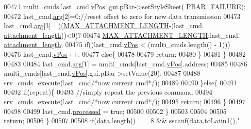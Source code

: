 \begin{DoxyCode}
{{{{{{{{{{{{{{{{00471                      multi\_cmds[last\_cmd.\hyperlink{a00004_a2b48b371fd84be2a8ad581b1ad708b88}{vPos}].gui.pBar->setStyleSheet(
      \hyperlink{a00090_aa9f43b2774395af6510910f8feed7cb4}{PBAR\_FAILURE});
00472                      last\_cmd.\hyperlink{a00004_a56e6c2d7315d0ae60a51e8b140c9cfe4}{arg}[2]=0;\textcolor{comment}{//reset offset to zero for new data transmission}
00473                      last\_cmd.\hyperlink{a00004_a56e6c2d7315d0ae60a51e8b140c9cfe4}{arg}[3]= ((\hyperlink{a00086_aa8abe3a822c64813f7aaba3ca7e3db9c}{MAX\_ATTACHMENT\_LENGTH}-(last\_cmd.
      \hyperlink{a00004_ae5afad7c81dab7d9ab6587251aafdbf4}{attachment\_length}))<0)?
00474                                           \hyperlink{a00086_aa8abe3a822c64813f7aaba3ca7e3db9c}{MAX\_ATTACHMENT\_LENGTH}:last\_cmd.
      \hyperlink{a00004_ae5afad7c81dab7d9ab6587251aafdbf4}{attachment\_length};
00475                      \textcolor{keywordflow}{if}((last\_cmd.\hyperlink{a00004_a2b48b371fd84be2a8ad581b1ad708b88}{vPos} < (multi\_cmds.length() - 1)))
00476                          last\_cmd.\hyperlink{a00004_a2b48b371fd84be2a8ad581b1ad708b88}{vPos}++;
00477                      \textcolor{keywordflow}{else}\{
00478 
00479                          \textcolor{keywordflow}{return};
00480                       \}
00481                      \}
00482 
00483 
00484                      last\_cmd.\hyperlink{a00004_a56e6c2d7315d0ae60a51e8b140c9cfe4}{arg}[1] = multi\_cmds[last\_cmd.\hyperlink{a00004_a2b48b371fd84be2a8ad581b1ad708b88}{vPos}].address;
00485 
00486                      multi\_cmds[last\_cmd.\hyperlink{a00004_a2b48b371fd84be2a8ad581b1ad708b88}{vPos}].gui.pBar->setValue(20);
00487 
00488                      srv\_cmds\_execute(last\_cmd\textcolor{comment}{/*now current cmd*/});
00489 
00490                  \}\textcolor{keywordflow}{else}\{
00491 
00492                      \textcolor{keywordflow}{if}(repeat)\{
00493                         \textcolor{comment}{//simply repeat the previous command}
00494                         srv\_cmds\_execute(last\_cmd\textcolor{comment}{/*now current cmd*/});
00495                         \textcolor{keywordflow}{return};
00496                      \}
00497 
00498 
00499                      last\_cmd.\hyperlink{a00004_a3e88f779da9798a5da7dda227e2ca388}{processed} = \textcolor{keyword}{true};
00500 
00502                  \}
00503 
00504 
00505             \textcolor{keywordflow}{return};
00506          \}
00507 
00508         \textcolor{keywordflow}{if}(data.length() == 8 && sscanf(data.toLatin1(),\textcolor{stringliteral}{"%
}}}}}}}}}}}}}}}}}
\end{DoxyCode}
